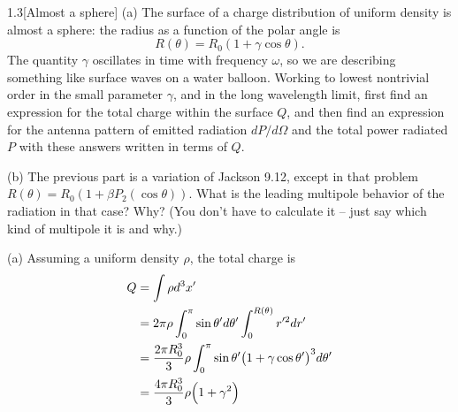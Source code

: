 \documentclass[12pt]{article}
\begin{document}
\begin{problem}{1.3}[Almost a sphere]
(a) The surface of a charge distribution of uniform density is almost a sphere:
the radius as a function of the polar angle is
\begin{equation}
    R(\theta)=R_0(1+\gamma\cos\theta). 
\end{equation}
The quantity $\gamma$ oscillates in time with frequency $\omega$, so we are
describing something like surface waves on a water balloon. Working to lowest
nontrivial order in the small parameter $\gamma$, and in the long wavelength
limit, first find an expression for the total charge within the surface $Q$, and
then find an expression for the antenna pattern of emitted radiation
$dP/d\Omega$ and the total power radiated $P$ with these answers written in
terms of $Q$.

(b) The previous part is a variation of Jackson 9.12, except in that problem
$R(\theta)=R_0(1+\beta P_2(\cos\theta))$. What is the leading multipole behavior
of the radiation in that case? Why? (You don't have to calculate it -- just say
which kind of multipole it is and why.)
\begin{solution}
(a) Assuming a uniform density $\rho$, the total charge is
\begin{align}\label{p3:Q}
    Q
    &=\int\rho d^3x' \notag\\
    &=2\pi\rho\int_0^\pi\sin\theta'd\theta'\int_0^{R(\theta)}r'^2dr'\notag\\
    &=\frac{2\pi R_0^3}3\rho
    \int_0^\pi\sin\theta'\qty(1+\gamma\cos\theta')^3d\theta'
    \notag\\
    &=\frac{4\pi R_0^3}{3}\rho\qty(1+\gamma^2)
\end{align}


\end{solution}
\end{problem}
\end{document}
